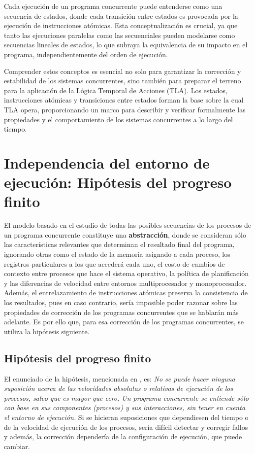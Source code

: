 Cada ejecución de un programa concurrente puede entenderse como una secuencia de estados, donde cada transición entre estados es provocada por la ejecución de instrucciones atómicas. Esta conceptualización es crucial, ya que tanto las ejecuciones paralelas como las secuenciales pueden modelarse como secuencias lineales de estados, lo que subraya la equivalencia de su impacto en el programa, independientemente del orden de ejecución.

Comprender estos conceptos es esencial no solo para garantizar la corrección y estabilidad de los sistemas concurrentes, sino también para preparar el terreno para la aplicación de la Lógica Temporal de Acciones (TLA). Los estados, instrucciones atómicas y transiciones entre estados forman la base sobre la cual TLA opera, proporcionando un marco para describir y verificar formalmente las propiedades y el comportamiento de los sistemas concurrentes a lo largo del tiempo.

\section{Independencia del entorno de ejecución: Hipótesis del progreso finito}\label{subsec:concurrentprogfinit}
El modelo basado en el estudio de todas las posibles secuencias de los procesos de un programa concurrente constituye una \textbf{abstracción}, donde se consideran sólo las características relevantes que determinan el resultado final del programa, ignorando otras como el estado de la memoria asignado a cada proceso, los registros particulares a los que accederá cada uno, el costo de cambios de contexto entre procesos que hace el sistema operativo, la política de planificación y las diferencias de velocidad entre entornos multiprocesador y monoprocesador. Además, el entrelazamiento de instrucciones atómicas preserva la consistencia de los resultados, pues en caso contrario, sería imposible poder razonar sobre las propiedades de corrección de los programas concurrentes que se hablarán más adelante. Es por ello que, para esa corrección de los programas concurrentes, se utiliza la hipótesis siguiente.

\subsection{Hipótesis del progreso finito}\label{subsubsec:concurrentprogfinithip}
El enunciado de la hipótesis, mencionada en \cite{capel2020sistemas}, es: \textit{No se puede hacer ninguna suposición acerca de las velocidades absolutas o relativas de ejecución de los procesos, salvo que es mayor que cero. Un programa concurrente se entiende sólo con base en sus componentes (procesos) y sus interacciones, sin tener en cuenta el entorno de ejecución.} Si se hicieran suposiciones que dependiesen del tiempo o de la velocidad de ejecución de los procesos, sería difícil detectar y corregir fallos y además, la corrección dependería de la configuración de ejecución, que puede cambiar.

